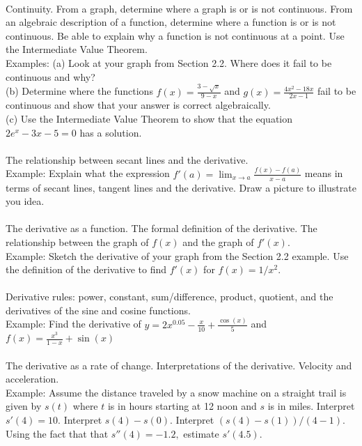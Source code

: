 \documentclass[11pt,fleqn]{article}
\begin{document}
\noindent {}\\
Continuity. From a graph, determine where a graph is or is not continuous. From an algebraic description of a function, determine where a function is or is not continuous. Be able to explain why a function is not continuous at a point. Use the Intermediate Value Theorem.\\

\noindent Examples: 
(a) Look at your graph from Section 2.2. Where does it fail to be continuous and why? \\
(b) Determine where the functions $f(x)= \frac{3-\sqrt{x}}{9-x}$ and $g(x)=  \frac{4x^2-18x}{2x-1}$ fail to be continuous and show that your answer is correct algebraically.\\
(c) Use the Intermediate Value Theorem to show that the equation $2e^x-3x-5=0$ has a solution.\\


\noindent {}\\
The relationship between secant lines and the derivative.\\

\noindent Example: Explain what the expression $f'(a) = \lim_{x \to a} \frac{f(x)-f(a)}{x-a}$ means in terms of secant lines, tangent lines and the derivative. Draw a picture to illustrate you idea.\\

\noindent {}\\
The derivative as a function. The formal definition of the derivative. The relationship between the graph of $f(x)$ and the graph of $f'(x).$\\

\noindent Example: Sketch the derivative of your graph from the Section 2.2 example. Use the definition of the derivative to find $f'(x)$ for $f(x)=1/x^2.$\\

\noindent {}\\
Derivative rules: power, constant, sum/difference, product, quotient, and the derivatives of the sine and cosine functions.\\

\noindent Example: Find the derivative of $y=2x^{0.05}-\frac{x}{10}+\frac{\cos(x)}{5}$ and $f(x)=\frac{x^3}{1-x}+ \sin(x)$\\

\noindent {}\\
The derivative as a rate of change. Interpretations of the derivative. Velocity and acceleration.\\

\noindent Example: Assume the distance traveled by a snow machine on a straight trail is given by $s(t)$ where $t$ is in hours starting at 12 noon and $s$ is in miles. Interpret $s'(4)=10.$ Interpret $s(4)-s(0).$ Interpret $(s(4)-s(1))/(4-1).$ Using the fact that that $s''(4)=-1.2,$ estimate $s'(4.5).$
\end{document}

